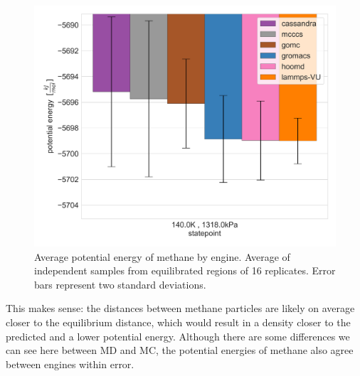 \begin{figure}[h!]
    \centering
    \includegraphics[width=0.8\linewidth,keepaspectratio]{figures/rep_study/methaneUA_pe_summary.png}
    \caption{Average potential energy of methane by engine. Average of independent samples from equilibrated regions of 16 replicates. Error bars represent two standard deviations.}\label{fig:methane_pe}
\end{figure}
This makes sense: the distances between methane particles are likely on average closer to the equilibrium distance, which would result in a density closer to the predicted and a lower potential energy.
Although there are some differences we can see here between MD and MC, the potential energies of methane also agree between engines within error.


